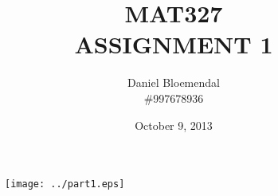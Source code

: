 \documentclass[oneside]{amsart}
\theoremstyle{definition}
\theoremstyle{remark}
\numberwithin{equation}{section}
\begin{document}
\title[CSC469 A1]{MAT327\\ASSIGNMENT 1}
\author{Daniel Bloemendal\\\#997678936}
\date{October 9, 2013}

\begin{titlepage}
\maketitle
\thispagestyle{empty}
\tableofcontents
\end{titlepage}

\begin{figure}[h]
    \centering
    \texttt{[image: ../part1.eps]}
\end{figure}

\end{document}
